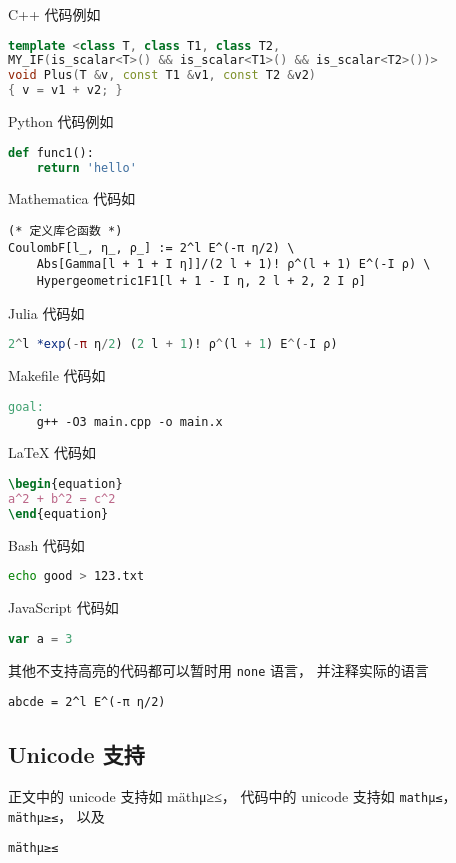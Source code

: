 C++ 代码例如
\begin{lstlisting}[language=cpp]
template <class T, class T1, class T2,
MY_IF(is_scalar<T>() && is_scalar<T1>() && is_scalar<T2>())>
void Plus(T &v, const T1 &v1, const T2 &v2)
{ v = v1 + v2; }
\end{lstlisting}

Python 代码例如
\begin{lstlisting}[language=python]
def func1():
	return 'hello'
\end{lstlisting}

Mathematica 代码如
\begin{lstlisting}[language=mma]
(* 定义库仑函数 *)
CoulombF[l_, η_, ρ_] := 2^l E^(-π η/2) \
    Abs[Gamma[l + 1 + I η]]/(2 l + 1)! ρ^(l + 1) E^(-I ρ) \
    Hypergeometric1F1[l + 1 - I η, 2 l + 2, 2 I ρ]
\end{lstlisting}

Julia 代码如
\begin{lstlisting}[language=julia]
2^l *exp(-π η/2) (2 l + 1)! ρ^(l + 1) E^(-I ρ)
\end{lstlisting}

Makefile 代码如
\begin{lstlisting}[language=Makefile]
goal:
    g++ -O3 main.cpp -o main.x
\end{lstlisting}

LaTeX 代码如
\begin{lstlisting}[language=latex]
\begin{equation}
a^2 + b^2 = c^2
\end{equation}
\end{lstlisting}

Bash 代码如
\begin{lstlisting}[language=bash]
echo good > 123.txt
\end{lstlisting}

JavaScript 代码如
\begin{lstlisting}[language=js]
var a = 3
\end{lstlisting}

其他不支持高亮的代码都可以暂时用 \verb|none| 语言， 并注释实际的语言
\begin{lstlisting}[language=none]
abcde = 2^l E^(-π η/2)
\end{lstlisting}

\subsection{Unicode 支持}
正文中的 unicode 支持如 mäthμ≥≤， 代码中的 unicode 支持如 \verb|mathμ≤|， \lstinline|mäthμ≥≤|， 以及
\begin{lstlisting}[language=none]
mäthμ≥≤
\end{lstlisting}

